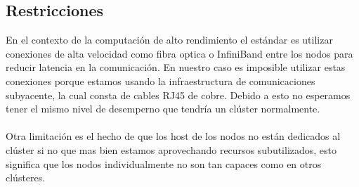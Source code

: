 \subsection{Restricciones}
En el contexto de la computación de alto rendimiento el estándar es utilizar conexiones de alta velocidad como fibra optica o InfiniBand entre los nodos para reducir latencia en la comunicación. En nuestro caso es imposible utilizar estas conexiones porque estamos usando la infraestructura de comunicaciones subyacente, la cual consta de cables RJ45 de cobre. Debido a esto no esperamos tener el mismo nivel de desemperno que tendría un clúster normalmente.\\
\\
Otra limitación es el hecho de que los host de los nodos no están dedicados al clúster si no que mas bien estamos aprovechando recursos subutilizados, esto significa que los nodos individualmente no son tan capaces como en otros clústeres.


